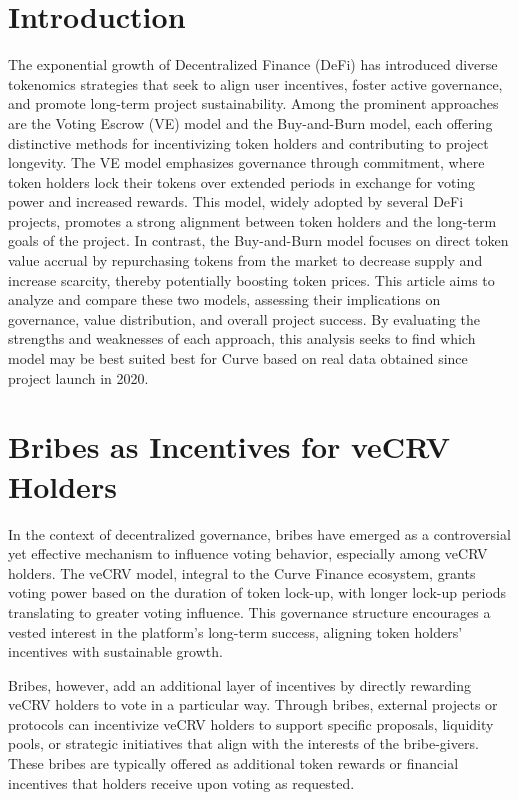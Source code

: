 \documentclass[notitlepage]{revtex4-2}
\begin{document}
\section{Introduction}
The exponential growth of Decentralized Finance (DeFi) has introduced diverse tokenomics strategies that seek to align
user incentives, foster active governance, and promote long-term project sustainability. Among the prominent approaches
are the Voting Escrow (VE) model and the Buy-and-Burn model, each offering distinctive methods for incentivizing token
holders and contributing to project longevity.
The VE model emphasizes governance through commitment, where token holders lock their tokens over extended periods in
exchange for voting power and increased rewards. This model, widely adopted by several DeFi projects,
promotes a strong alignment between token holders and the long-term goals of the project. In contrast, the Buy-and-Burn
model focuses on direct token value accrual by repurchasing tokens from the market to decrease supply and increase
scarcity, thereby potentially boosting token prices.
This article aims to analyze and compare these two models, assessing their implications on governance, value
distribution, and overall project success. By evaluating the strengths and weaknesses of each approach, this analysis
seeks to find which model may be best suited best for Curve based on real data obtained since project launch in 2020.

\section{Bribes as Incentives for veCRV Holders}

In the context of decentralized governance, bribes have emerged as a controversial yet effective mechanism to influence
voting behavior, especially among veCRV holders. The veCRV model, integral to the Curve Finance ecosystem, grants
voting power based on the duration of token lock-up, with longer lock-up periods translating to greater voting
influence. This governance structure encourages a vested interest in the platform’s long-term success, aligning token
holders' incentives with sustainable growth.

Bribes, however, add an additional layer of incentives by directly rewarding veCRV holders to vote in a particular way.
Through bribes, external projects or protocols can incentivize veCRV holders to support specific proposals,
liquidity pools, or strategic initiatives that align with the interests of the bribe-givers. These bribes are typically
offered as additional token rewards or financial incentives that holders receive upon voting as requested.
\end{document}
